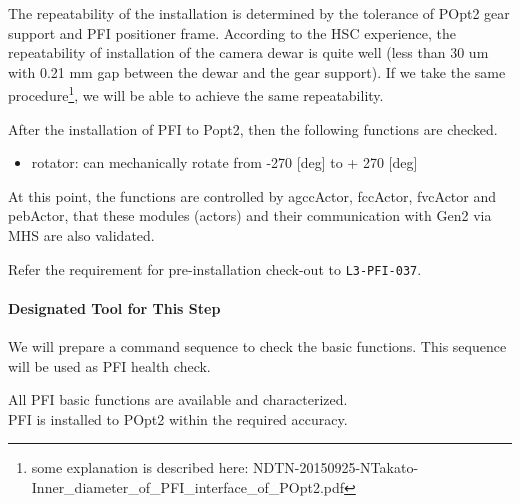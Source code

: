 The repeatability of the installation is determined by the tolerance of POpt2 gear support and PFI positioner frame.
According to the HSC experience, the repeatability of installation of the camera dewar is quite well (less than 30 um with 0.21 mm gap between the dewar and the gear support).
If we take the same procedure\footnote{some explanation is described here: NDTN-20150925-NTakato-Inner\_diameter\_of\_PFI\_interface\_of\_POpt2.pdf}, we will be able to achieve the same repeatability.

After the installation of PFI to Popt2, then the following functions are checked.
\begin{itemize}
\item rotator: can mechanically rotate from -270 [deg] to + 270 [deg]
\end{itemize}

At this point, the functions are controlled by agccActor, fccActor, fvcActor and pebActor, that these modules (actors) and their communication with Gen2 via MHS are also validated.

Refer the requirement for pre-installation check-out to {\tt L3-PFI-037}.

\paragraph{Designated Tool for This Step} 
We will prepare a command sequence to check the basic functions.
This sequence will be used as PFI health check.

\begin{itembox}[l]{}
All PFI basic functions are available and characterized.\\
PFI is installed to POpt2 within the required accuracy. 

\end{itembox}